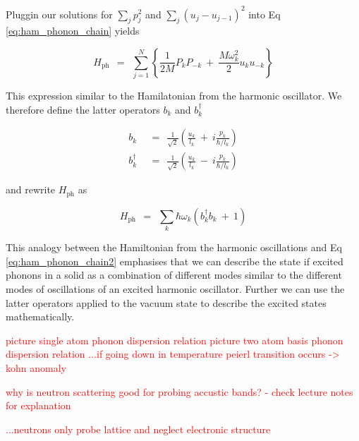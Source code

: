 \documentclass[10pt]{report}
\numberwithin{equation}{chapter}
\newcommand{\refEq}[1]{
  Eq  \ref{#1}
}
\begin{document}
Pluggin our solutions for $\sum_j p_j^2$ and $\sum_j (u_j-u_{j-1})^2$ into \refEq{eq:ham_phonon_chain} yields

\begin{equation}\label{eq:ham_phonon_chain2}
  H_\text{ph} ~~=~~ \sum_{j=1}^N \left\{ \frac{1}{2M} P_k P_{-k} ~+~ \frac{M \omega_k^2}{2} u_k u_{-k} \right\} 
\end{equation}

This expression similar to the Hamilatonian from the harmonic oscillator. We therefore define the latter operators $b_k$ and $b_k^\dag$

\begin{align}
  b_k ~~& =~~ \frac{1}{\sqrt{2}} \left( \frac{u_k}{l_k} ~+~ i \frac{p_k}{\hbar/l_k} \right)\\
  b_k^\dag ~~& =~~ \frac{1}{\sqrt{2}} \left( \frac{u_k}{l_k} ~-~ i\frac{p_k}{\hbar/l_k} \right)
\end{align}

and rewrite $H_\text{ph}$ as 

\begin{equation}
  H_\text{ph} ~~=~~ \sum_k \hbar \omega_k (b^\dag_k b_k ~+~ 1)
\end{equation}

This analogy between the Hamiltonian from the harmonic oscillations and \refEq{eq:ham_phonon_chain2} emphasises that we can describe the state if excited phonons in a solid as a combination of different modes similar to the different modes of oscillations of an excited harmonic oscillator. Further we can use the latter operators applied to the vacuum state to describe the excited states mathematically.

\textcolor{red}{picture single atom phonon dispersion relation}
\textcolor{red}{picture two atom basis phonon dispersion relation}
\textcolor{red}{...if going down in temperature peierl transition occurs -> kohn anomaly}

\textcolor{red}{why is neutron scattering good for probing accustic bands? - check lecture notes for explanation}

\textcolor{red}{...neutrons only probe lattice and neglect electronic structure}





%
\end{document}
